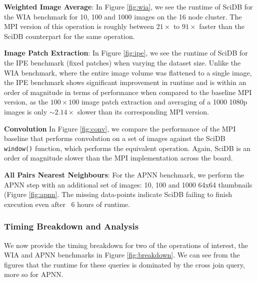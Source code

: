 \documentclass[tog]{acmsiggraph}
\begin{document}
\textbf{Weighted Image Average}: In Figure \ref{fig:wia}, we see the runtime of SciDB for the WIA benchmark for 10, 100 and 1000 images on the 16 node cluster. The MPI version of this operation is roughly between $21\times$ to $91\times$ faster than the SciDB counterpart for the same operation.

\textbf{Image Patch Extraction}: 
In Figure \ref{fig:ipe}, we see the runtime of SciDB for the IPE benchmark (fixed patches) when varying the dataset size. Unlike the WIA benchmark, where the entire image volume was flattened to a single image, the IPE benchmark shows significant improvement in runtime and is within an order of magnitude in terms of performance when compared to the baseline MPI version, as the $100\times100$ image patch extraction and averaging of a 1000 1080p images is only $\sim 2.14\times$ slower than its corresponding MPI version.

\textbf{Convolution} In Figure \ref{fig:conv}, we compare the performance of the MPI baseline that performs convolution on a set of images against the SciDB \texttt{window()} function, which performs the equivalent operation. Again, SciDB is an order of magnitude slower than the MPI implementation across the board.

\textbf{All Pairs Nearest Neighbours}: For the APNN benchmark, we perform the APNN step with an additional set of images: 10, 100 and 1000 64x64 thumbnails (Figure \ref{fig:apnn}. The missing data-points indicate SciDB failing to finish execution even after ~6 hours of runtime. 


\subsubsection{Timing Breakdown and Analysis}\label{sec:breakdown}
We now provide the timing breakdown for two of the operations of interest, the WIA and APNN benchmarks in Figure \ref{fig:breakdown}. We can see from the figures that the runtime for these queries is dominated by the cross join query, more so for APNN.
\end{document}

